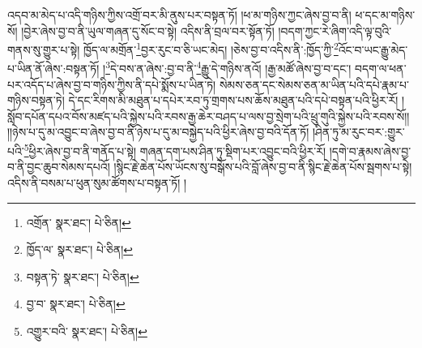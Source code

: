 འདབ་མ་མེད་པ་འདི་གཉིས་ཀྱིས་འགྲོ་བར་མི་ནུས་པར་བསྟན་ཏོ། །ཕ་མ་གཉིས་ཀྱང་ཞེས་བྱ་བ་ནི། ཕ་དང་མ་གཉིས་སོ། །བྱེར་ཞེས་བྱ་བ་ནི་ཡུལ་གཞན་དུ་སོང་བ་སྟེ། འདིས་ནི་བྲལ་བར་སྟོན་ཏོ། །བདག་ཀྱང་རེ་ཞིག་འདི་ལྟ་བུའི་གནས་སུ་གྱུར་པ་སྟེ། ཁྱོད་ལ་མགྲོན་\footnote{འགྲོན་  སྣར་ཐང་།  པེ་ཅིན། }བྱར་རུང་བ་ཅི་ཡང་མེད། །ཅེས་བྱ་བ་འདིས་ནི་:ཁྱོད་ཀྱི་\footnote{ཁྱོད་ལ་  སྣར་ཐང་།  པེ་ཅིན། }འོང་བ་ཡང་རྒྱུ་མེད་པ་ཡིན་ནོ་ཞེས་:བསྟན་ཏོ། །\footnote{བསྟན་ཏེ་  སྣར་ཐང་།  པེ་ཅིན། }དེ་བས་ན་ཞེས་:བྱ་བ་ནི་\footnote{བྱ་བ་  སྣར་ཐང་།  པེ་ཅིན། }རྒྱུ་དེ་གཉིས་ནའོ། །རྒྱ་མཚོ་ཞེས་བྱ་བ་དང་། བདག་ལ་ཕན་པར་འདོད་པ་ཞེས་བྱ་བ་གཉིས་ཀྱིས་ནི་དཔེ་སྨོས་པ་ཡིན་ཏེ། སེམས་ཅན་དང་སེམས་ཅན་མ་ཡིན་པའི་དཔེ་རྣམ་པ་གཉིས་བསྟན་ཏེ། དེ་དང་རིགས་མི་མཐུན་པ་དཔེར་རབ་ཏུ་གྲགས་པས་ཆོས་མཐུན་པའི་དཔེ་བསྟན་པའི་ཕྱིར་རོ། །སློབ་དཔོན་དཔའ་བོས་མཛད་པའི་སྐྱེས་པའི་རབས་རྒྱ་ཆེར་བཤད་པ་ལས་བྱ་སྲེག་པའི་ཕྲུ་གུའི་སྐྱེས་པའི་རབས་སོ།། །།ཉེས་པ་དུ་མ་འབྱུང་བ་ཞེས་བྱ་བ་ནི་ཉེས་པ་དུ་མ་བསྐྱེད་པའི་ཕྱིར་ཞེས་བྱ་བའི་དོན་ཏོ། །ཤིན་ཏུ་མ་རུང་བར་:གྱུར་པའི་\footnote{འགྱུར་བའི་  སྣར་ཐང་།  པེ་ཅིན། }ཕྱིར་ཞེས་བྱ་བ་ནི་གནོད་པ་སྟེ། གཞན་དག་པས་ཤིན་ཏུ་སྡིག་པར་འབྱུང་བའི་ཕྱིར་རོ། །དགེ་བ་རྣམས་ཞེས་བྱ་བ་ནི་བྱང་ཆུབ་སེམས་དཔའོ། །སྙིང་རྗེ་ཆེན་པོས་ཡོངས་སུ་བསྒོས་པའི་བློ་ཞེས་བྱ་བ་ནི་སྙིང་རྗེ་ཆེན་པོས་སྦགས་པ་སྟེ། འདིས་ནི་བསམ་པ་ཕུན་སུམ་ཚོགས་པ་བསྟན་ཏོ། །
